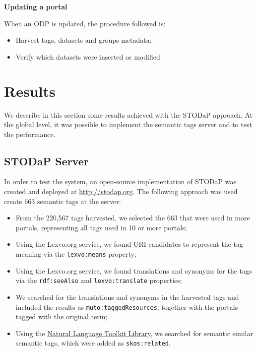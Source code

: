 \textbf{Updating a portal}

When an ODP is updated, the procedure followed is:
\begin{itemize}
	\item Harvest tags, datasets and groups metadata;
	\item Verify which datasets were inserted or modified
\end{itemize}

\section{Results}
\label{sec:results}

We describe in this section some results achieved with the STODaP approach.
At the global level, it was possible to implement the semantic tags server and to test the performance.

\subsection{STODaP Server}

In order to test the system, an open-source implementation of STODaP was created and deployed at \url{http://stodap.org}.
The following approach was used create 663 semantic tags at the server:
\begin{itemize}
	\item From the 220,567 tags harvested, we selected the 663 that were used in more portals, representing all tags used in 10 or more portals; 
	\item Using the Lexvo.org service, we found URI candidates to represent the tag meaning via the \texttt{lexvo:means} property;
	\item Using the Lexvo.org service, we found translations and synonyms for the tags via the \texttt{rdf:seeAlso} and \texttt{lexvo:translate} properties;
	\item We searched for the translations and synonyms in the harvested tags and included the results as \texttt{muto:taggedResources}, together with the portals tagged with the original term;
	\item Using the \href{http://www.nltk.org/}{Natural Language Toolkit  Library}, we searched for semantic similar semantic tags, which were added as \texttt{skos:related}.
\end{itemize}

